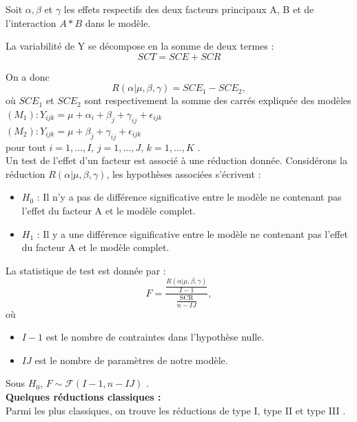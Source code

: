\documentclass[12pt,a4paper]{article}
\begin{document}
	Soit $\alpha, \beta$ et $\gamma$ les effets respectifs des deux facteurs principaux A, B et de l'interaction $A*B$ dans le modèle.
	
	La variabilité de Y se décompose en la somme de deux termes \cite{maistre2023}: 
	\begin{equation}
		SCT = SCE + SCR
	\end{equation}
	
	On a donc 
	\begin{equation}
		R(\alpha|\mu,\beta,\gamma) = SCE_1 - SCE_2,
	\end{equation}
	où $SCE_1$ et $SCE_2$ sont respectivement la somme des carrés expliquée des modèles\\
	
	\noindent
	$(M_1) : Y_{ijk} = \mu + \alpha_i + \beta_j + \gamma_{ij} + \epsilon_{ijk}$\\
	$(M_2) : Y_{ijk} = \mu + \beta_j + \gamma_{ij} + \epsilon_{ijk}$\\
	pour tout $i = 1,\ldots,I$, $j = 1,\ldots,J$, $k = 1,\ldots,K$ \cite{daudin}.\\
	
	Un test de l'effet d'un facteur est associé à une réduction donnée. Considérons la réduction $R(\alpha|\mu,\beta,\gamma)$, les hypothèses associées s'écrivent : 
	\begin{itemize}[label=--, leftmargin=*]
		\item $H_0$ : Il n'y a pas de différence significative entre le modèle ne contenant pas l'effet du facteur A et le modèle complet.
		\item $H_1$ : Il y a une différence significative entre le modèle ne contenant pas l'effet du facteur A et le modèle complet.
	\end{itemize}
	La statistique de test est donnée par : 
	\begin{equation}
		F = \frac{\frac{R(\alpha|\mu,\beta,\gamma)}{I-1}}{\frac{\text{SCR}}{n-IJ}},
	\end{equation}
	où 
	\begin{itemize}[label=--, leftmargin=*]
		\item $I-1$ est le nombre de contraintes dans l'hypothèse nulle.
		\item $IJ$ est le nombre de paramètres de notre modèle.
	\end{itemize}
	Sous $H_0$, $F \sim \mathcal{F}(I-1, n-IJ)$ \cite{daudin}. \\
	
	\noindent
	\textbf{Quelques réductions classiques :} \\
	Parmi les plus classiques, on trouve les réductions de type I, type II et type III \cite{daudin}.
	
\end{document}
